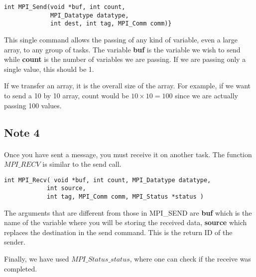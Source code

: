 \documentclass[%
oneside,                 %
final,                   %
10pt]{article}
\begin{document}
\begin{verbatim}
int MPI_Send(void *buf, int count, 
             MPI_Datatype datatype, 
             int dest, int tag, MPI_Comm comm)}

\end{verbatim}

This single command allows the passing of any kind of variable, even a large array, to any group of tasks. 
The variable \textbf{buf} is the variable we wish to send while \textbf{count}
is the  number of variables we are passing. If we are passing only a single value, this should be 1. 

If we transfer an array, it is  the overall size of the array. 
For example, if we want to send a 10 by 10 array, count would be $10\times 10=100$ 
since we are  actually passing 100 values.



\subsection*{Note 4}

\paragraph{}

Once you have  sent a message, you must receive it on another task. The function $MPI\_RECV$
is similar to the send call.




\begin{verbatim}
int MPI_Recv( void *buf, int count, MPI_Datatype datatype, 
            int source, 
            int tag, MPI_Comm comm, MPI_Status *status )

\end{verbatim}


The arguments that are different from those in MPI\_SEND are
\textbf{buf} which  is the name of the variable where you will  be storing the received data, 
\textbf{source} which  replaces the destination in the send command. This is the return ID of the sender.

Finally,  we have used  $MPI\_Status\_status$,  
where one can check if the receive was completed.
\end{document}
